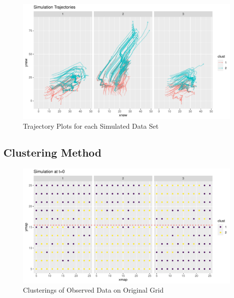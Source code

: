 \documentclass[12pt]{article}
\begin{document}
\begin{figure}[tbp]

{\centering \includegraphics[width=\linewidth,]{spatio-temporal-model-arctic-sea-ice_files/figure-latex/traj-wrap-1} 

}

\caption{Trajectory Plots for each Simulated Data Set }\label{fig:traj-wrap}
\end{figure}

\hypertarget{clustering-method}{%
\subsection{Clustering Method}\label{clustering-method}}

\begin{figure}[tbp]

{\centering \includegraphics[width=\linewidth,]{spatio-temporal-model-arctic-sea-ice_files/figure-latex/plot-og-clus-1} 

}

\caption{Clusterings of Observed Data on Original Grid}\label{fig:plot-og-clus}
\end{figure}
\end{document}
